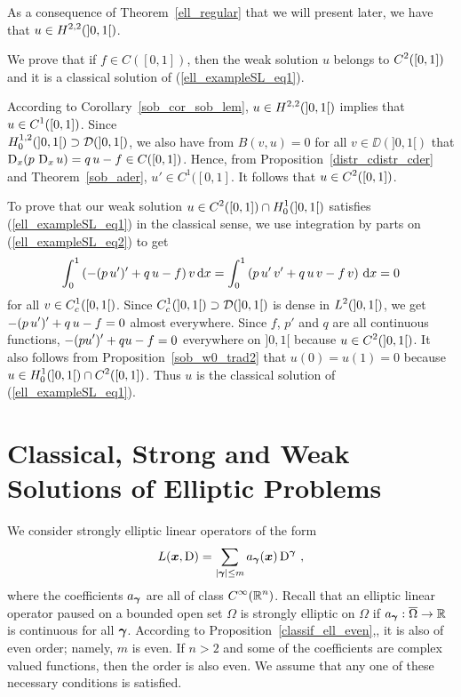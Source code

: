 \begin{egg}
As a consequence of Theorem~\ref{ell_regular} that we will present later,
we have that $\displaystyle u\in H^{2,2}(]0,1[)$.

We prove that if $f \in C([0,1])$, then
the weak solution $u$ belongs to $\displaystyle C^2([0,1])$ and it is
a classical solution of (\ref{ell_exampleSL_eq1}).

According to Corollary~\ref{sob_cor_sob_lem},
$\displaystyle u\in H^{2,2}(]0,1[)$
implies that $\displaystyle u \in C^1([0,1])$.  Since\\
$\displaystyle H^{1,2}_0(]0,1[) \supset \mathcal{D}(]0,1[)$,
we also have from $B(v,u)=0$ for all $v \in \DD(]0,1[)$ that
$\operatorname{D}_x(p\, \operatorname{D}_x u) = q\,u - f \in C([0,1])$.  Hence, from
Proposition~\ref{distr_cdistr_cder} and Theorem~\ref{sob_ader},
$u'\in C^1([0,1]$.  It follows that $\displaystyle u \in C^2([0,1])$.

To prove that our weak solution
$\displaystyle u \in C^2([0,1]) \cap H^1_0(]0,1[)$
satisfies (\ref{ell_exampleSL_eq1}) in the classical sense, we use
integration by parts on (\ref{ell_exampleSL_eq2}) to get
\[
\int_0^1 \left( -(p\,u')' + q\,u - f\right) v \,\mathrm{d}{x} =
\int_0^1 \left( p\,u'\, v' + q\,u\,v - f\, v\right) \,\mathrm{d}{x} = 0
\]
for all $\displaystyle v \in C^1_c([0,1[)$.
Since $\displaystyle C^1_c(]0,1[)\supset \mathcal{D}(]0,1[)$ is dense in
$\displaystyle L^2(]0,1[)$, we
get $\displaystyle -(p\,u')' + q\,u - f = 0$ almost
everywhere.  Since $f$, $p'$ and $q$ are all continuous functions,
$\displaystyle -(pu')' + q u -f = 0$ everywhere on $]0,1[$ because
$\displaystyle u\in C^2(]0,1[)$.  It also follows from
Proposition~\ref{sob_w0_trad2} that $u(0)=u(1)=0$ because
$\displaystyle u \in H^1_0(]0,1[)\cap C^2([0,1])$.  Thus $u$ is the classical
solution of (\ref{ell_exampleSL_eq1}). 
\end{egg}

\section[Classical, Strong and Weak Solutions]{Classical, Strong and
Weak Solutions of Elliptic Problems} \label{CSWSsection}

We consider strongly elliptic linear operators of the form
\begin{equation} \label{ell_op1} 
L({\bm{x}}, \operatorname{D}) = \sum_{|{\bm{\gamma}}|\leq m} a_{{\bm{\gamma}}}({\bm{x}})
\operatorname{D}^{{\bm{\gamma}}} \ ,
\end{equation}
where the coefficients $a_{{\bm{\gamma}}}$ are all of class
$\displaystyle C^\infty(\mathbb{R}^n)$.
Recall that an elliptic linear operator paused
on a bounded open set $\Omega$ is strongly elliptic on $\Omega$ if
$a_{{\bm{\gamma}}}:\overline{\Omega} \to \mathbb{R}$ is continuous for all
${\bm{\gamma}}$.
According to Proposition~\ref{classif_ell_even},, it is also of even
order; namely, $m$ is even.  If $n>2$ and some of the coefficients are
complex valued functions, then the order is also even.
We assume that any one of these necessary conditions is satisfied.

